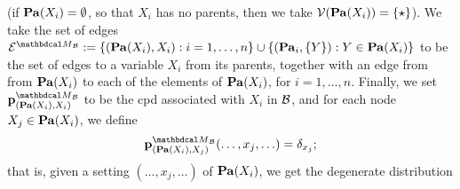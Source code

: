 \begin{defn}
(if $\mathbf{Pa}(X_i) = \emptyset$, so that $X_i$ has no parents, then we 
	 take $\mathcal V(\mathbf{Pa}(X_i)) = \{\star\}$).
%
We take the set of edges $\Ed^{\PDGof{{\mathcal B}}} := \{ (\Pa(X_i), X_i) : 
	 i = 1, \ldots, n \} \cup \{ (\Pa_i, \{Y\}) : Y \in
			\Pa(X_i)\}$ to be the set of edges to a variable $X_i$
	  from its parents, together with an edge from
	  from $\mathbf{Pa}(X_i)$ to each of the elements of $\mathbf{Pa}(X_i)$, for
	  $i = 1, \ldots, n$.  
	Finally, we set $\mat p^{\PDGof{{\mathcal
				B}}}_{(\Pa(X_i), X_i)}$ to be the cpd associated
			with $X_i$ in $\cal B$, and for each node $X_j \in \mathbf{Pa}(X_i)$,
			we define
	\[ \mat p^{\PDGof{\mathcal B}}_{(\Pa(X_i),
			  X_j)}(\ldots, x_j, \ldots) = \delta_{x_j};\]
that is, given a setting $(\ldots, x_j, \ldots)$ of $\mathbf{Pa}(X_i)$, 
we get the degenerate distribution  
\end{defn}

